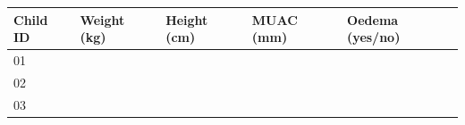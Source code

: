 \documentclass[12pt,a4paper]{book}
\theoremstyle{definition}
\theoremstyle{definition}
\theoremstyle{definition}
\theoremstyle{remark}
\begin{document}
\begin{longtable}[]{@{}lllll@{}}
\toprule
\begin{minipage}[b]{0.17\columnwidth}\raggedright
Child ID\strut
\end{minipage} & \begin{minipage}[b]{0.17\columnwidth}\raggedright
Weight (kg)\strut
\end{minipage} & \begin{minipage}[b]{0.17\columnwidth}\raggedright
Height (cm)\strut
\end{minipage} & \begin{minipage}[b]{0.17\columnwidth}\raggedright
MUAC (mm)\strut
\end{minipage} & \begin{minipage}[b]{0.17\columnwidth}\raggedright
Oedema (yes/no)\strut
\end{minipage}\tabularnewline
\midrule
\endhead
\begin{minipage}[t]{0.17\columnwidth}\raggedright
01\strut
\end{minipage} & \begin{minipage}[t]{0.17\columnwidth}\raggedright
\strut
\end{minipage} & \begin{minipage}[t]{0.17\columnwidth}\raggedright
\strut
\end{minipage} & \begin{minipage}[t]{0.17\columnwidth}\raggedright
\strut
\end{minipage} & \begin{minipage}[t]{0.17\columnwidth}\raggedright
\strut
\end{minipage}\tabularnewline
\begin{minipage}[t]{0.17\columnwidth}\raggedright
02\strut
\end{minipage} & \begin{minipage}[t]{0.17\columnwidth}\raggedright
\strut
\end{minipage} & \begin{minipage}[t]{0.17\columnwidth}\raggedright
\strut
\end{minipage} & \begin{minipage}[t]{0.17\columnwidth}\raggedright
\strut
\end{minipage} & \begin{minipage}[t]{0.17\columnwidth}\raggedright
\strut
\end{minipage}\tabularnewline
\begin{minipage}[t]{0.17\columnwidth}\raggedright
03\strut

\end{minipage}
\end{longtable}
\end{document}
